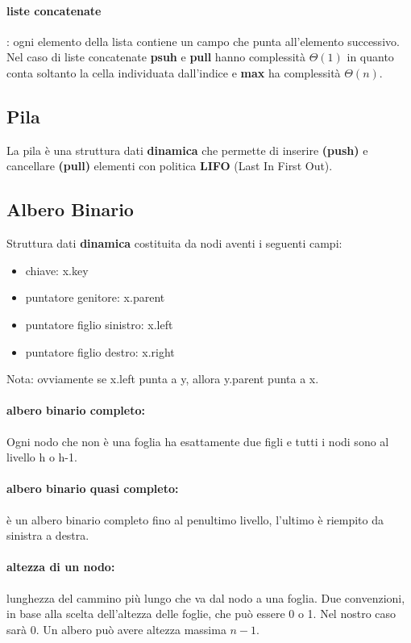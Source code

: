\documentclass{article}
\begin{document}
 \paragraph{liste concatenate}: ogni elemento della lista contiene un campo che punta all'elemento successivo.
 Nel caso di liste concatenate \textbf{psuh}
e \textbf{pull} hanno complessità $\Theta(1)$ in quanto conta soltanto la cella individuata dall'indice
 e \textbf{max} ha complessità $\Theta(n)$.
 
\subsection{Pila} %
La pila è una struttura dati \textbf{dinamica} che permette di inserire \textbf{(push)} e cancellare \textbf{(pull)}
 elementi con politica \textbf{LIFO} (Last In First Out).

\subsection{Albero Binario} %
Struttura dati \textbf{dinamica} costituita da nodi aventi i seguenti campi:
\begin{itemize}
    \item chiave: x.key
    \item puntatore genitore: x.parent
    \item puntatore figlio sinistro: x.left
    \item puntatore figlio destro: x.right
\end{itemize}
Nota: ovviamente se x.left punta a y, allora y.parent punta a x. 

\paragraph{albero binario completo:} Ogni nodo che non è una foglia ha esattamente due figli e tutti i 
nodi sono al livello h o h-1.

\paragraph{albero binario quasi completo:} è un albero binario completo fino al penultimo livello, l'ultimo è 
riempito da sinistra a destra.

\paragraph{altezza di un nodo:} lunghezza del cammino più lungo che va dal nodo a una foglia. Due convenzioni, in base
alla scelta dell'altezza delle foglie, che può essere 0 o 1. Nel nostro caso sarà 0. 
Un albero può avere altezza massima $n-1$.
\end{document}
